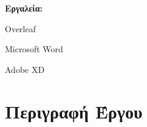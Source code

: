 \documentclass[12pt,a4paper,oneside]{article}
\begin{document}
\vspace{7cm}

\raggedright
\textbf{Εργαλεία:}

    Overleaf
    
    Microsoft Word

    Adobe XD
\newpage


\tableofcontents
{}

\newpage
\setcounter{page}{1}


\section{Περιγραφή Έργου}\label{sec:intro}
\pagestyle{fancy}
\end{document}
